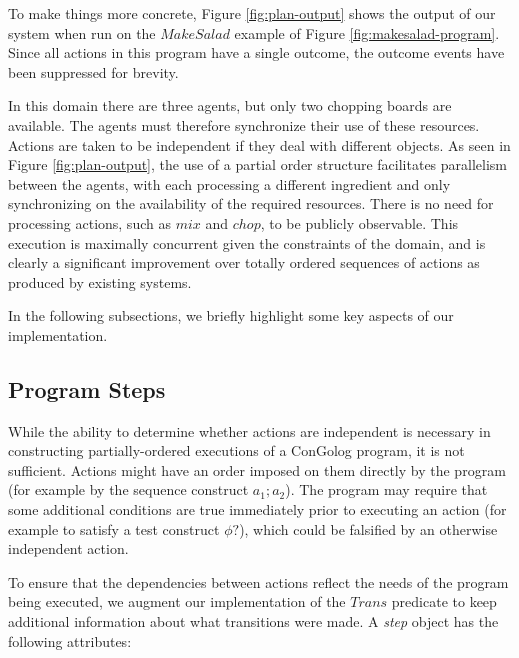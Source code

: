 To make things more concrete, Figure \ref{fig:plan-output} shows
the output of our system when run on the $MakeSalad$ example of Figure
\ref{fig:makesalad-program}. Since all actions in this program have
a single outcome, the outcome events have been suppressed for brevity.

In this domain there are three agents, but only two chopping boards
are available. The agents must therefore synchronize their use of
these resources. Actions are taken to be independent if they deal
with different objects. As seen in Figure \ref{fig:plan-output},
the use of a partial order structure facilitates parallelism between
the agents, with each processing a different ingredient and only synchronizing
on the availability of the required resources. There is no need for
processing actions, such as $mix$ and $chop$, to be publicly observable.
This execution is maximally concurrent given the constraints of the
domain, and is clearly a significant improvement over totally ordered
sequences of actions as produced by existing systems.

In the following subsections, we briefly highlight some key aspects
of our implementation.


\subsection{Program Steps}

While the ability to determine whether actions are independent is
necessary in constructing partially-ordered executions of a ConGolog
program, it is not sufficient. Actions might have an order imposed
on them directly by the program (for example by the sequence construct
$a_{1};a_{2}$). The program may require that some additional conditions
are true immediately prior to executing an action (for example to
satisfy a test construct $\phi?$), which could be falsified by an
otherwise independent action.

To ensure that the dependencies between actions reflect the needs
of the program being executed, we augment our implementation of the
$Trans$ predicate to keep additional information about what transitions
were made. A \emph{step} object has the following attributes:

